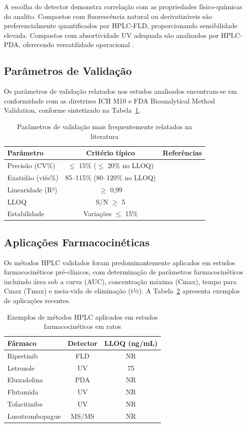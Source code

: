 A escolha do detector demonstra correlação com as propriedades físico-químicas do analito. Compostos com fluorescência natural ou derivatizáveis são preferencialmente quantificados por HPLC-FLD, proporcionando sensibilidade elevada. Compostos com absortividade UV adequada são analisados por HPLC-PDA, oferecendo versatilidade operacional \cite{singh2023}.

\subsection{Parâmetros de Validação}

Os parâmetros de validação relatados nos estudos analisados encontram-se em conformidade com as diretrizes ICH M10 e FDA Bioanalytical Method Validation, conforme sintetizado na Tabela~\ref{tab:validacao}.

\begin{table}[ht]
\caption{Parâmetros de validação mais frequentemente relatados na literatura}
\label{tab:validacao}
\begin{tabular}{lcc}
\hline
Parâmetro & Critério típico & Referências \\
\hline
Precisão (CV\%) & $\leq$ 15\% ($\leq$ 20\% no LLOQ) & \cite{kosta2024, singh2023} \\
Exatidão (viés\%) & 85--115\% (80--120\% no LLOQ) & \\
Linearidade (R²) & $\geq$ 0,99 & \cite{singh2023} \\
LLOQ & S/N $\geq$ 5 & \cite{ich2005} \\
Estabilidade & Variações $\leq$ 15\% & \cite{fda2018} \\
\hline
\end{tabular}
\end{table}

\subsection{Aplicações Farmacocinéticas}

Os métodos HPLC validados foram predominantemente aplicados em estudos farmacocinéticos pré-clínicos, com determinação de parâmetros farmacocinéticos incluindo área sob a curva (AUC), concentração máxima (Cmax), tempo para Cmax (Tmax) e meia-vida de eliminação (t½). A Tabela~\ref{tab:aplicacoes} apresenta exemplos de aplicações recentes.

\begin{table}[ht]
\caption{Exemplos de métodos HPLC aplicados em estudos farmacocinéticos em ratos}
\label{tab:aplicacoes}
\begin{tabular}{lcc}
\hline
Fármaco & Detector & LLOQ (ng/mL) \\
\hline
Ripretinib & FLD & NR \\
Letrozole & UV & 75 \\
Eluxadolina & PDA & NR \\
Flutamida & UV & NR \\
Tofacitinibe & UV & NR \\
Lusutrombopague & MS/MS & NR \\
\hline
\end{tabular}
\end{table}

